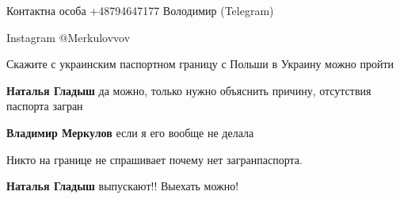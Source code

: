 Контактна особа +48794647177 Володимир (Telegram) 

Instagram @Merkulovvov


\begin{itemize} %
Скажите с украинским паспортном границу с Польши в Украину можно пройти

\textbf{Наталья Гладыш} да можно, только нужно объяснить причину, отсутствия паспорта загран

\textbf{Владимир Меркулов} если я его вообще не делала

Никто на границе не спрашивает почему нет загранпаспорта.

\textbf{Наталья Гладыш} выпускают!! Выехать можно!

\end{itemize} %
